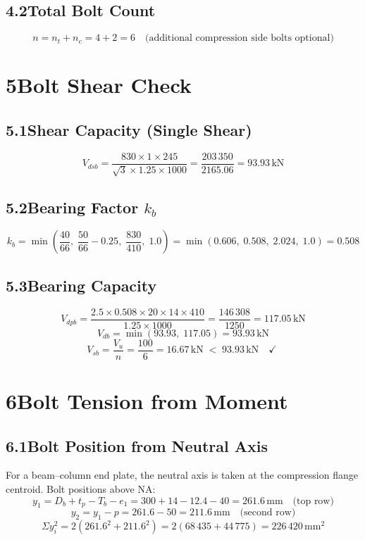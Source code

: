 \documentclass[12pt,a4paper]{article}
\newcommand{\kN}{\,\text{kN}}
\newcommand{\mm}{\,\text{mm}}
\newcommand{\mmsq}{\,\text{mm}^2}
\begin{document}
\subsection{4.2\quad Total Bolt Count}
\[
  n = n_t + n_c = 4 + 2 = 6 \quad\text{(additional compression side bolts optional)}
\]

\section{5\quad Bolt Shear Check}

\subsection{5.1\quad Shear Capacity (Single Shear)}
\[
  V_{dsb} = \frac{830\times 1\times 245}{\sqrt{3}\times 1.25\times 1000}
           = \frac{203\,350}{2165.06}
           = \boxed{93.93\kN}
  \tag{IS 800 Cl.10.3.3}
\]

\subsection{5.2\quad Bearing Factor $k_b$}
\[
  k_b = \min\!\left(\frac{40}{66},\;\frac{50}{66}-0.25,\;\frac{830}{410},\;1.0\right)
      = \min(0.606,\;0.508,\;2.024,\;1.0)
      = \boxed{0.508}
\]

\subsection{5.3\quad Bearing Capacity}
\[
  V_{dpb} = \frac{2.5\times 0.508\times 20\times 14\times 410}{1.25\times 1000}
           = \frac{146\,308}{1250}
           = \boxed{117.05\kN}
  \tag{IS 800 Cl.10.3.4}
\]
\[
  V_{db} = \min(93.93,\;117.05) = \boxed{93.93\kN}
\]
\[
  V_{sb} = \frac{V_u}{n} = \frac{100}{6} = 16.67\kN
  \;<\; 93.93\kN \quad\checkmark\;
\]

\section{6\quad Bolt Tension from Moment}

\subsection{6.1\quad Bolt Position from Neutral Axis}
For a beam–column end plate, the neutral axis is taken at the compression flange centroid. Bolt positions above NA:
\[
  y_1 = D_b + t_p - T_b - e_1 = 300 + 14 - 12.4 - 40 = 261.6\mm \quad\text{(top row)}
\]
\[
  y_2 = y_1 - p = 261.6 - 50 = 211.6\mm \quad\text{(second row)}
\]
\[
  \Sigma y_i^2 = 2(261.6^2 + 211.6^2) = 2(68\,435 + 44\,775) = 226\,420\mmsq
\]
\end{document}
